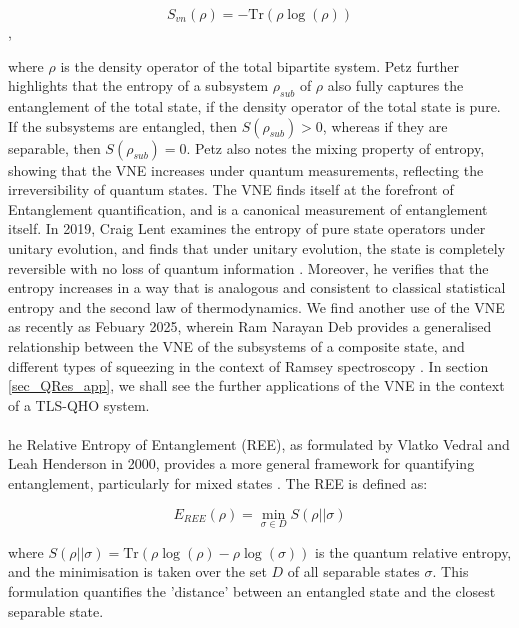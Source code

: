 \documentclass[12pt,a4paper]{article}
\begin{document}
\begin{equation}
    S_{vn}(\rho) = -\text{Tr}(\rho\log({\rho}))
\end{equation},

where $\rho$ is the density operator of the total bipartite system. Petz further highlights that the entropy of a subsystem $\rho_{sub}$ of $\rho$ also fully captures the entanglement of the total state, if the density operator of the total state is pure. If the subsystems are entangled, then $S(\rho_{sub}) > 0$, whereas if they are separable, then $S(\rho_{sub}) = 0$. Petz also notes the mixing property of entropy, showing that the VNE increases under quantum measurements, reflecting the irreversibility of quantum states. The VNE finds itself at the forefront of Entanglement quantification, and is a canonical measurement of entanglement itself. In 2019, Craig Lent examines the entropy of pure state operators under unitary evolution, and finds that under unitary evolution, the state is completely reversible with no loss of quantum information \cite{Entanglement2019_VNE_example}. Moreover, he verifies that the entropy increases in a way that is analogous and consistent to classical statistical entropy and the second law of thermodynamics. We find another use of the VNE as recently as Febuary 2025, wherein Ram Narayan Deb provides a generalised relationship between the VNE of the subsystems of a composite state, and different types of squeezing in the context of Ramsey spectroscopy \cite{Entanglement2025_VNE_example}. In section \ref{sec_QRes_app}, we shall see the further applications of the VNE in the context of a TLS-QHO system. \\
\\
he Relative Entropy of Entanglement (REE), as formulated by Vlatko Vedral and Leah Henderson in 2000, provides a more general framework for quantifying entanglement, particularly for mixed states \cite{Entanglement2000-REE_definition}. The REE is defined as: 

\begin{equation}
    E_{REE}(\rho) = \min_{\sigma \in D}  S(\rho||\sigma)
\end{equation}

where $ S(\rho||\sigma) = \text{Tr}(\rho\log(\rho) - \rho\log(\sigma))$ is the quantum relative entropy, and the minimisation is taken over the set $D$ of all separable states $\sigma$. This formulation quantifies the 'distance' between an entangled state and the closest separable state. 
\end{document}
